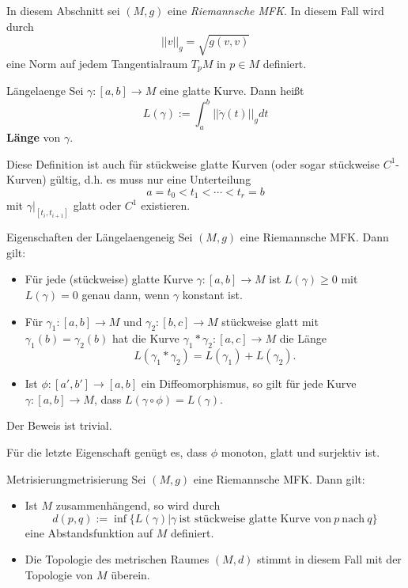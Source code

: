 In diesem Abschnitt sei $(M,g)$ eine \textit{Riemannsche MFK}. In diesem Fall wird durch
\begin{equation}
||v||_g = \sqrt{g(v,v)}
\end{equation}
eine Norm auf jedem Tangentialraum $T_pM$ in $p \in M$ definiert.
\begin{definition}{Länge}{laenge}
Sei $\gamma: [a,b] \to M$ eine glatte Kurve. Dann heißt
\begin{equation}
L(\gamma) := \int_a^b || \dot{\gamma}(t) ||_g dt
\end{equation}
\textbf{Länge} von $\gamma$.
\end{definition}
\begin{bemerkung}
Diese Definition ist auch für stückweise glatte Kurven (oder sogar stückweise $C^1$-Kurven) gültig, d.h. es muss nur eine Unterteilung
\begin{equation}
a = t_0 < t_1 < \cdots < t_r =b
\end{equation}
mit $\gamma|_{[t_i, t_{i+1}]}$ glatt oder $C^1$ existieren.
\end{bemerkung}
\begin{satz}{Eigenschaften der Länge}{laengeneig}
Sei $(M, g)$ eine Riemannsche MFK. Dann gilt:
\begin{itemize}
\item Für jede (stückweise) glatte Kurve $\gamma: [a,b] \to M$ ist $L(\gamma) \geq 0$ mit $L(\gamma)=0$ genau dann, wenn $\gamma$ konstant ist.
\item Für $\gamma_1:[a,b] \to M$ und $\gamma_2: [b,c] \to M$ stückweise glatt mit $\gamma_1(b)=\gamma_2(b)$ hat die Kurve $\gamma_1 \ast \gamma_2: [a,c] \to M$ die Länge
\begin{equation}
L(\gamma_1 \ast \gamma_2) = L(\gamma_1) + L(\gamma_2).
\end{equation}
\item Ist $\phi: [a',b'] \to [a,b]$ ein Diffeomorphismus, so gilt für jede Kurve $\gamma: [a,b] \to M$, dass $L(\gamma \circ \phi) = L(\gamma)$.
\end{itemize}
\end{satz}
\begin{beweis}
Der Beweis ist trivial.
\end{beweis}
\begin{bemerkung}
Für die letzte Eigenschaft genügt es, dass $\phi$ monoton, glatt und surjektiv ist.
\end{bemerkung}
\begin{satz}{Metrisierung}{metrisierung}
Sei $(M,g)$ eine Riemannsche MFK. Dann gilt:
\begin{itemize}
\item Ist $M$ zusammenhängend, so wird durch
\begin{equation}
d(p,q) := \inf \{ L(\gamma) | \gamma \ \text{ist stückweise glatte Kurve von} \ p \ \text{nach} \ q \}
\end{equation}
eine Abstandsfunktion auf $M$ definiert.
\item Die Topologie des metrischen Raumes $(M,d)$ stimmt in diesem Fall mit der Topologie von $M$ überein.
\end{itemize}
\end{satz}
